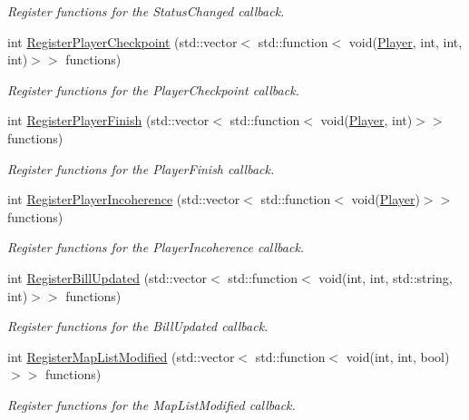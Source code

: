 \begin{DoxyCompactItemize}
\begin{DoxyCompactList}\small\item\em Register functions for the Status\-Changed callback. \end{DoxyCompactList}\item 
int \hyperlink{classEventManager_ac9a8f0e6f7c4750e476059955042ccad}{Register\-Player\-Checkpoint} (std\-::vector$<$ std\-::function$<$ void(\hyperlink{structPlayer}{Player}, int, int, int)$>$$>$ functions)
\begin{DoxyCompactList}\small\item\em Register functions for the Player\-Checkpoint callback. \end{DoxyCompactList}\item 
int \hyperlink{classEventManager_a4f23806f21b01bd408630d604f8cb6a0}{Register\-Player\-Finish} (std\-::vector$<$ std\-::function$<$ void(\hyperlink{structPlayer}{Player}, int)$>$$>$ functions)
\begin{DoxyCompactList}\small\item\em Register functions for the Player\-Finish callback. \end{DoxyCompactList}\item 
int \hyperlink{classEventManager_a05fec5b169d8bf0abd1e32908b33c074}{Register\-Player\-Incoherence} (std\-::vector$<$ std\-::function$<$ void(\hyperlink{structPlayer}{Player})$>$$>$ functions)
\begin{DoxyCompactList}\small\item\em Register functions for the Player\-Incoherence callback. \end{DoxyCompactList}\item 
int \hyperlink{classEventManager_a8ce3c162bdc0cad5ea03e9bf1233c991}{Register\-Bill\-Updated} (std\-::vector$<$ std\-::function$<$ void(int, int, std\-::string, int)$>$$>$ functions)
\begin{DoxyCompactList}\small\item\em Register functions for the Bill\-Updated callback. \end{DoxyCompactList}\item 
int \hyperlink{classEventManager_a2793498f3b1e3bf82c9d8caab49387c0}{Register\-Map\-List\-Modified} (std\-::vector$<$ std\-::function$<$ void(int, int, bool)$>$$>$ functions)
\begin{DoxyCompactList}\small\item\em Register functions for the Map\-List\-Modified callback. \end{DoxyCompactList}\item 
$$
\end{DoxyCompactItemize}

